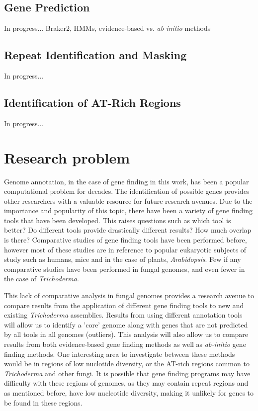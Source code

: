 \documentclass[12pt]{article}
\begin{document}
\subsection{Gene Prediction}
In progress... Braker2, HMMs, evidence-based vs. \textit{ab initio}
methods

\subsection{Repeat Identification and Masking}
In progress...

\subsection{Identification of AT-Rich Regions}
In progress...

\section{Research problem}

Genome annotation, in the case of gene finding in this work, has been
a popular computational problem for decades. The identification of
possible genes provides other researchers with a valuable resource for
future research avenues. Due to the importance and popularity of this
topic, there have been a variety of gene finding tools that have been
developed. This raises questions such as which tool is better? Do
different tools provide drastically different results? How much
overlap is there? Comparative studies of gene finding tools have been
performed before, however most of these studies are in reference to
popular eukaryotic subjects of study such as humans, mice and in the
case of plants, \textit{Arabidopsis}. Few if any comparative studies
have been performed in fungal genomes, and even fewer in the case of
\textit{Trichoderma}.

This lack of comparative analysis in fungal genomes provides a
research avenue to compare results from the application of different
gene finding tools to new and existing \textit{Trichoderma}
assemblies. Results from using different annotation tools will allow
us to identify a 'core' genome along with genes that are not predicted
by all tools in all genomes (outliers). This analysis will also allow
us to compare results from both evidence-based gene finding methods as
well as \textit{ab-initio} gene finding methods. One interesting area
to investigate between these methods would be in regions of low
nuclotide diversity, or the AT-rich regions common to
\textit{Trichoderma} and other fungi. It is possible that gene finding
programs may have difficulty with these regions of genomes, as they
may contain repeat regions and as mentioned before, have low
nucleotide diversity, making it unlikely for genes to be found in
these regions.
\end{document}
